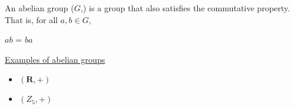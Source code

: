 \begin{definition}

An abelian group ($G$,) is a group that also satisfies the commutative property. That is, for all $a, b \in G$, 

\begin{center}
    $a$$b$ = $b$$a$
\end{center}

\begin{center}
    \underline{Examples of abelian groups}
\end{center}

\begin{itemize}
    \item $(\mathbf{R}, +)$
    \item $(Z_5, +)$
\end{itemize}


\end{definition}


